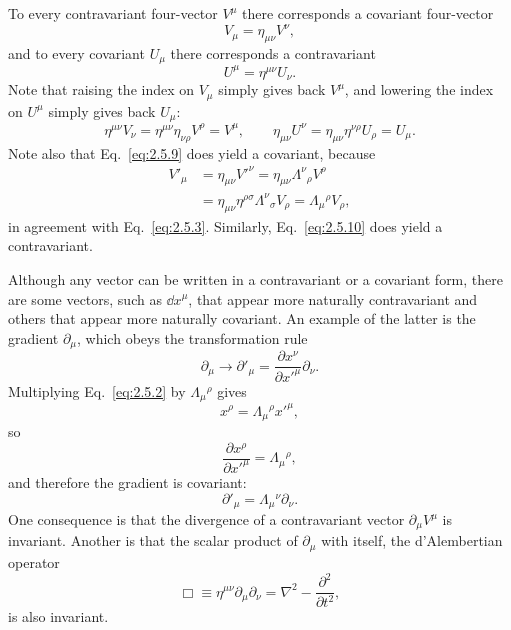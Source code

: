 To every contravariant four-vector \(V^\mu\) there corresponds a covariant
four-vector
\begin{equation}
  V_\mu=\eta_{\mu\nu}V^\nu ,
  \tag{2.5.9}\label{eq:2.5.9}
\end{equation}
and to every covariant \(U_\mu\) there corresponds a contravariant
\begin{equation}
  U^\mu=\eta^{\mu\nu}U_\nu .
  \tag{2.5.10}\label{eq:2.5.10}
\end{equation}
Note that raising the index on \(V_\mu\) simply gives back \(V^\mu\), and
lowering the index on \(U^\mu\) simply gives back \(U_\mu\):
\[
  \eta^{\mu\nu}V_\nu
  =\eta^{\mu\nu}\eta_{\nu\rho}V^\rho=V^\mu,
  \qquad
  \eta_{\mu\nu}U^\nu
  =\eta_{\mu\nu}\eta^{\nu\rho}U_\rho=U_\mu .
\]
Note also that Eq.~\eqref{eq:2.5.9} does yield a covariant, because
\[
\begin{aligned}
  V'_\mu
  &=\eta_{\mu\nu}V'^\nu
   =\eta_{\mu\nu}\Lambda^\nu{}_\rho V^\rho\\
  &=\eta_{\mu\nu}\eta^{\rho\sigma}\Lambda^\nu{}_\sigma V_\rho
   =\Lambda_\mu{}^\rho V_\rho ,
\end{aligned}
\]
in agreement with Eq.~\eqref{eq:2.5.3}. Similarly,
Eq.~\eqref{eq:2.5.10} does yield a contravariant.

Although any vector can be written in a contravariant or a covariant form,
there are some vectors, such as \(\dd x^\mu\), that appear more naturally
contravariant and others that appear more naturally covariant. An example of
the latter is the gradient \(\partial_\mu\), which obeys the transformation rule
\[
  \partial_\mu
  \longrightarrow
  \partial'_\mu
  =\frac{\partial x^\nu}{\partial x'^\mu}
   \partial_\nu.
\]
Multiplying Eq.~\eqref{eq:2.5.2} by \(\Lambda_\mu{}^\rho\) gives
\[
  x^\rho=\Lambda_\mu{}^\rho x'^\mu ,
\]
so
\[
  \frac{\partial x^\rho}{\partial x'^\mu}
  =\Lambda_\mu{}^\rho ,
\]
and therefore the gradient is covariant:
\begin{equation}
  \partial'_\mu=\Lambda_\mu{}^\nu\partial_\nu .
  \tag{2.5.11}\label{eq:2.5.11}
\end{equation}
One consequence is that the divergence of a contravariant vector
\(\partial_\mu V^\mu\) is invariant. Another is that the scalar product of
\(\partial_\mu\) with itself, the d'Alembertian operator
\begin{equation}
  \Box\equiv\eta^{\mu\nu}\partial_\mu\partial_\nu
  =\nabla^2-\frac{\partial^2}{\partial t^2},
  \tag{2.5.12}\label{eq:2.5.12}
\end{equation}
is also invariant.

